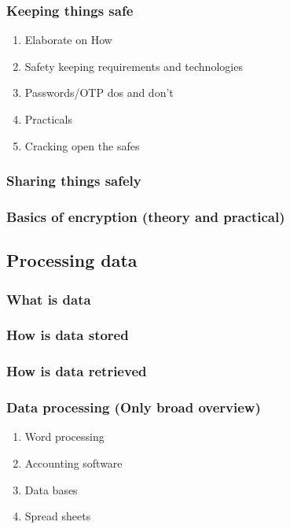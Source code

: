 \documentclass[11pt]{article}
\begin{document}
\subsubsection{Keeping things safe}
\label{sec:orgdca01a1}
\begin{enumerate}
\item Elaborate on How
\label{sec:org4077156}
\item Safety keeping requirements and technologies
\label{sec:orge6c3e53}
\item Passwords/OTP dos and don't
\label{sec:org5386ba0}
\item Practicals
\label{sec:orgf1c44e2}
\item Cracking open the safes
\label{sec:org8eb2aa1}
\end{enumerate}
\subsubsection{Sharing things safely}
\label{sec:org7cce206}
\subsubsection{Basics of encryption (theory and practical)}
\label{sec:org7f47c21}
\subsection{Processing data}
\label{sec:orgc591503}
\subsubsection{What is data}
\label{sec:org48c1826}
\subsubsection{How is data stored}
\label{sec:orgce1909f}
\subsubsection{How is data retrieved}
\label{sec:orge9ed9d7}
\subsubsection{Data processing (Only broad overview)}
\label{sec:orgd4243e9}
\begin{enumerate}
\item Word processing
\label{sec:org839996c}
\item Accounting software
\label{sec:org607d2b8}
\item Data bases
\label{sec:orgec83be7}
\item Spread sheets
\label{sec:org7c3dc9f}
\end{enumerate}
\end{document}
